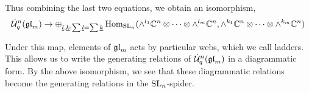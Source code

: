 \documentclass[11pt,leqno]{article}
\begin{document}
Thus combining the last two equations, we obtain an isomorphism,
\begin{equation*}
\dot{{\mathcal{U}}}_q^n({\mathfrak{gl}}_m) \rightarrow \oplus_{{\underline{l}}, {\underline{k}} : \sum {\underline{l}} = \sum {\underline{k}}} \operatorname{Hom}_{{\rm{SL}}_n}(\wedge^{l_1} \mathbb C^n \otimes \cdots \otimes \wedge^{l_m} \mathbb C^n, \wedge^{k_1} \mathbb C^n \otimes \cdots \otimes \wedge^{k_m} \mathbb C^n)
\end{equation*}

Under this map, elements of ${\mathfrak{gl}}_m $ acts by particular webs, which we call ladders.  This allows us to write the generating relations of $ \dot{{\mathcal{U}}}_q^n({\mathfrak{gl}}_m) $ in a diagrammatic form.  By the above isomorphism, we see that these diagrammatic relations become the generating relations in the $ {\rm{SL}}_n $-spider.




\end{document}
